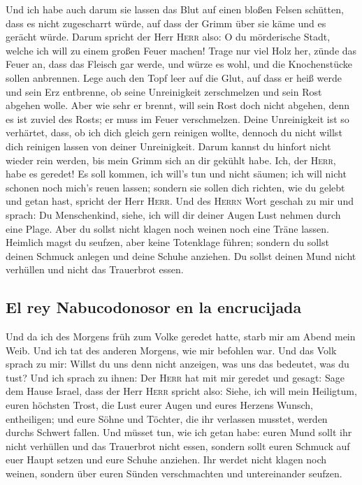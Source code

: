  Und ich habe auch darum sie lassen das Blut auf einen
bloßen Felsen schütten, dass es nicht zugescharrt würde, auf dass der
Grimm über sie käme und es gerächt würde.  Darum spricht
der Herr \textsc{Herr} also: O du mörderische Stadt, welche ich will zu
einem großen Feuer machen!  Trage nur viel Holz her,
zünde das Feuer an, dass das Fleisch gar werde, und würze es wohl, und
die Knochenstücke sollen anbrennen.  Lege auch den Topf
leer auf die Glut, auf dass er heiß werde und sein Erz entbrenne, ob
seine Unreinigkeit zerschmelzen und sein Rost abgehen wolle.
 Aber wie sehr er brennt, will sein Rost doch nicht
abgehen, denn es ist zuviel des Rosts; er muss im Feuer verschmelzen.
 Deine Unreinigkeit ist so verhärtet, dass, ob ich dich
gleich gern reinigen wollte, dennoch du nicht willst dich reinigen
lassen von deiner Unreinigkeit. Darum kannst du hinfort nicht wieder
rein werden, bis mein Grimm sich an dir gekühlt habe. 
Ich, der \textsc{Herr}, habe es geredet! Es soll kommen, ich will's tun
und nicht säumen; ich will nicht schonen noch mich's reuen lassen;
sondern sie sollen dich richten, wie du gelebt und getan hast, spricht
der Herr \textsc{Herr}.  Und des \textsc{Herrn} Wort
geschah zu mir und sprach:  Du Menschenkind, siehe, ich
will dir deiner Augen Lust nehmen durch eine Plage. Aber du sollst nicht
klagen noch weinen noch eine Träne lassen.  Heimlich
magst du seufzen, aber keine Totenklage führen; sondern du sollst deinen
Schmuck anlegen und deine Schuhe anziehen. Du sollst deinen Mund nicht
verhüllen und nicht das Trauerbrot essen.

\hypertarget{el-rey-nabucodonosor-en-la-encrucijada}{%
\subsection{El rey Nabucodonosor en la
encrucijada}\label{el-rey-nabucodonosor-en-la-encrucijada}}

 Und da ich des Morgens früh zum Volke geredet hatte,
starb mir am Abend mein Weib. Und ich tat des anderen Morgens, wie mir
befohlen war.  Und das Volk sprach zu mir: Willst du uns
denn nicht anzeigen, was uns das bedeutet, was du tust? 
Und ich sprach zu ihnen: Der \textsc{Herr} hat mit mir geredet und
gesagt:  Sage dem Hause Israel, dass der Herr
\textsc{Herr} spricht also: Siehe, ich will mein Heiligtum, euren
höchsten Trost, die Lust eurer Augen und eures Herzens Wunsch,
entheiligen; und eure Söhne und Töchter, die ihr verlassen musstet,
werden durchs Schwert fallen.  Und müsset tun, wie ich
getan habe: euren Mund sollt ihr nicht verhüllen und das Trauerbrot
nicht essen,  sondern sollt euren Schmuck auf euer Haupt
setzen und eure Schuhe anziehen. Ihr werdet nicht klagen noch weinen,
sondern über euren Sünden verschmachten und untereinander seufzen.

